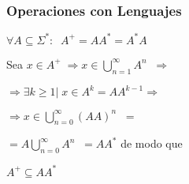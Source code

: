 \begin{frame}
  \frametitle{Operaciones con Lenguajes}
      \begin{teor}
			$\forall A \subseteq \Sigma^*: \; \; A^+ = AA^* = A^*A$
      \end{teor}
      \pause

      \begin{demo}
            {Sea $x \in A^+ \; \Rightarrow x \in \displaystyle\bigcup_{n=1}^{\infty} A^n \; \; \Rightarrow$}

            {$\Rightarrow \exists k \geq 1 | \; x \in A^k = AA^{k-1}  \Rightarrow$}

					  {$\Rightarrow x \in \displaystyle\bigcup_{n=0}^{\infty} (AA)^n \; \; = $}

					  {$= A \displaystyle\bigcup_{n=0}^{\infty} A^n \; \; = AA^*$ de modo que }

					  {$A^+ \subseteq AA^*$}
      \end{demo}
\end{frame}
